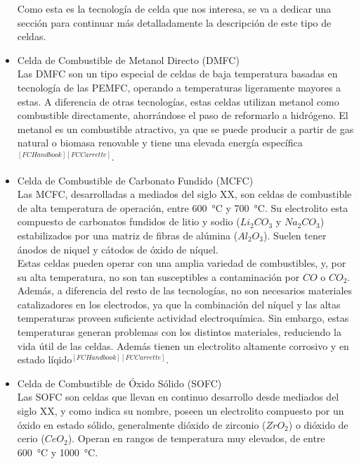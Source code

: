 \begin{itemize}
    Como esta es la tecnología de celda que nos interesa, se va a dedicar una sección para continuar más detalladamente la descripción de este tipo de celdas.\\

    \item {\SemiBold Celda de Combustible de Metanol Directo (DMFC)}\\

    Las DMFC son un tipo especial de celdas de baja temperatura basadas en tecnología de las PEMFC, operando a temperaturas ligeramente mayores a estas. A diferencia de otras tecnologías, estas celdas utilizan metanol como combustible directamente, ahorrándose el paso de reformarlo a hidrógeno. El metanol es un combustible atractivo, ya que se puede producir a partir de gas natural o biomasa renovable y tiene una elevada energía específica$^{[FCHandbook][FCCarrette]}$.\\

    \item {\SemiBold Celda de Combustible de Carbonato Fundido (MCFC)}\\

    Las MCFC, desarrolladas a mediados del siglo XX, son celdas de combustible de alta temperatura de operación, entre \SI{600}{\celsius} y \SI{700}{\celsius}. Su electrolito esta compuesto de carbonatos fundidos de litio y sodio ($Li_2CO_3$ y $Na_2CO_3$) estabilizados por una matriz de fibras de alúmina ($Al_2O_3$). Suelen tener ánodos de niquel y cátodos de óxido de níquel.\\

    Estas celdas pueden operar con una amplia variedad de combustibles, y, por su alta temperatura, no son tan susceptibles a contaminación por $CO$ o $CO_2$. Además, a diferencia del resto de las tecnologías, no son necesarios materiales catalizadores en los electrodos, ya que la combinación del níquel y las altas temperaturas proveen suficiente actividad electroquímica. Sin embargo, estas temperaturas generan problemas con los distintos materiales, reduciendo la vida útil de las celdas. Además tienen un electrolito altamente corrosivo y en estado líqido$^{[FCHandbook][FCCarrette]}$.\\

    \item {\SemiBold Celda de Combustible de Óxido Sólido (SOFC)}\\

    Las SOFC son celdas que llevan en continuo desarrollo desde mediados del siglo XX, y como indica su nombre, poseen un electrolito compuesto por un óxido en estado sólido, generalmente dióxido de zirconio ($ZrO_2$) o dióxido de cerio ($CeO_2$). Operan en rangos de temperatura muy elevados, de entre \SI{600}{\celsius} y \SI{1000}{\celsius}.\\


\end{itemize}
